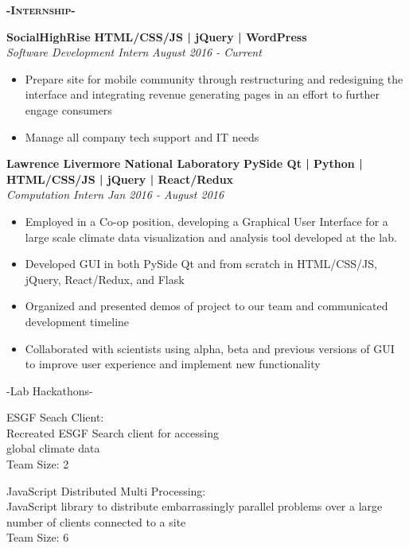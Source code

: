 \documentclass[12pt]{article}
\begin{document}
\center
\color{black}
\color{black}
\begin{center}
\textbf{\textsc{-Internship-}}\\
\end{center}
\begin{footnotesize}
\flushleft
\color{Cerulean}\textbf{SocialHighRise}\hfill \color{TealBlue} \textbf{HTML/CSS/JS | jQuery | WordPress } \\ \color{Black}\textit{Software Development Intern} \hfill \textit{August 2016 - Current}
\color{black}
\begin{itemize}
    \setlength{\itemsep}{0pt}
	\item Prepare site for mobile community through restructuring and redesigning the interface and integrating revenue generating pages in an effort to further engage consumers
	\item Manage all company tech support and IT needs
\end{itemize}
\color{Cerulean}\textbf{Lawrence Livermore National Laboratory} \color{Black} \hfill
\color{TealBlue} \textbf{PySide Qt | Python | HTML/CSS/JS | jQuery | React/Redux}\\
\color{Black} \textit{Computation Intern} \hfill\textit{Jan 2016 - August 2016} 
\color{Black}
\begin{itemize}
    \setlength{\itemsep}{0pt}
	\item Employed in a Co-op position, developing a Graphical User Interface for a large scale climate data visualization and analysis tool developed at the lab.
	\item Developed GUI in both PySide Qt and from scratch in HTML/CSS/JS, jQuery, React/Redux, and Flask

	\item Organized and presented demos of project to our team and communicated development timeline
	\item Collaborated with scientists using alpha, beta and previous versions of GUI to improve user experience and implement new functionality
\end{itemize}

\center
-Lab Hackathons-
\begin{multicols}{2}
\center
\color{Cerulean}ESGF Seach Client:\\ \color{black}
Recreated ESGF Search client for accessing\\
global climate data\\
Team Size: 2

\columnbreak

\color{Cerulean}JavaScript Distributed Multi Processing:\\ \color{black}
JavaScript library to distribute embarrassingly parallel problems over a large number of clients connected to a site\\
Team Size: 6


\end{multicols}
\medskip

\end{footnotesize}
\end{document}

